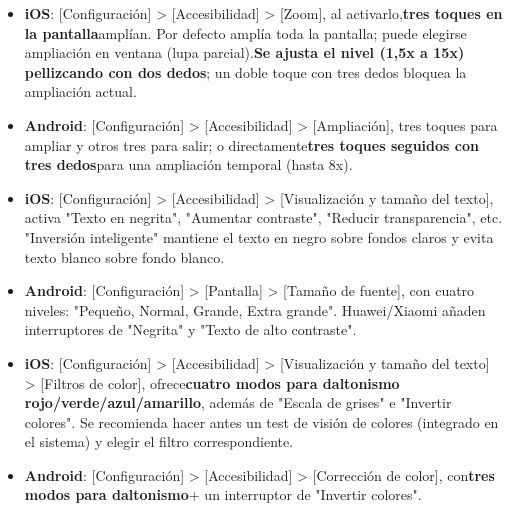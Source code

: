 

\begin{itemize}
  \item \textbf{iOS}: [Configuración] > [Accesibilidad] > [Zoom], al activarlo,\textbf{tres toques en la pantalla}amplían. Por defecto amplía toda la pantalla; puede elegirse ampliación en ventana (lupa parcial).\textbf{Se ajusta el nivel (1,5x a 15x) pellizcando con dos dedos}; un doble toque con tres dedos bloquea la ampliación actual.
  \item \textbf{Android}: [Configuración] > [Accesibilidad] > [Ampliación], tres toques para ampliar y otros tres para salir; o directamente\textbf{tres toques seguidos con tres dedos}para una ampliación temporal (hasta 8x).
\end{itemize}


\begin{itemize}
  \item \textbf{iOS}: [Configuración] > [Accesibilidad] > [Visualización y tamaño del texto], activa "Texto en negrita", "Aumentar contraste", "Reducir transparencia", etc. "Inversión inteligente" mantiene el texto en negro sobre fondos claros y evita texto blanco sobre fondo blanco.
  \item \textbf{Android}: [Configuración] > [Pantalla] > [Tamaño de fuente], con cuatro niveles: "Pequeño, Normal, Grande, Extra grande". Huawei/Xiaomi añaden interruptores de "Negrita" y "Texto de alto contraste".
\end{itemize}


\begin{itemize}
  \item \textbf{iOS}: [Configuración] > [Accesibilidad] > [Visualización y tamaño del texto] > [Filtros de color], ofrece\textbf{cuatro modos para daltonismo rojo/verde/azul/amarillo}, además de "Escala de grises" e "Invertir colores". Se recomienda hacer antes un test de visión de colores (integrado en el sistema) y elegir el filtro correspondiente.
  \item \textbf{Android}: [Configuración] > [Accesibilidad] > [Corrección de color], con\textbf{tres modos para daltonismo}+ un interruptor de "Invertir colores".
\end{itemize}

